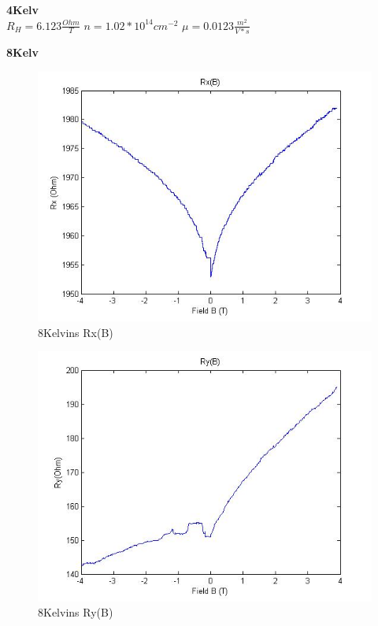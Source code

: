 \documentclass[idxtotoc,hyperref,openany,oneside]{labbook} %
\begin{document}
\normalsize \textbf{4Kelv}\\
$R_H=6.123 \frac{Ohm}{T}$
\newline
$n=1.02*10^{14} cm^{-2}$
\newline
$\mu=0.0123 \frac{m^2}{V*s}$
\newline
\newline


\normalsize \textbf{8Kelv}\\
\begin{figure}[H] %
\begin{center}
\includegraphics[width=1\linewidth]{7468kRx(B).jpg}
\end{center}
\caption{8Kelvins Rx(B)}
\label{fig:fig10}
\end{figure}

\begin{figure}[H] %
\begin{center}
\includegraphics[width=1\linewidth]{7468kRy(B).jpg}
\end{center}
\caption{8Kelvins Ry(B)}
\label{fig:fig11}
\end{figure}
\end{document}
